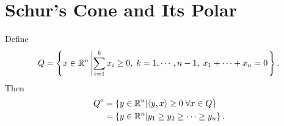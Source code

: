 \documentclass[12pt]{article}
\begin{document}
\section{Schur's Cone and Its Polar}
    \begin{example}
        Define
        \begin{equation}
            Q = \left\lbrace
                x\in \mathbb R^n \left|
                    \sum_{i = 1}^{k} x_i
                    \ge 0, \;
                    k = 1 ,\cdots, n-1, \;
                    x_1 + \cdots + x_n = 0
                \right.
            \right\rbrace.
        \end{equation}
        Then
        \begin{align}
            Q^\circ &= \left\lbrace
               y\in\mathbb R^n |
               \langle y, x\rangle \ge 0 \; \forall x \in Q
            \right\rbrace
            \\
            &=
            \left\lbrace
                y\in\mathbb R^n | y_{1} \ge y_2\ge \cdots  \ge y_n
            \right\rbrace.
        \end{align}
    \end{example}
\end{document}
